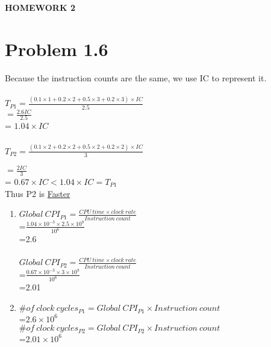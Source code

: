 \documentclass[]{article}
\begin{document}
\centerline{\bf \Large HOMEWORK 2} 

\bigskip
\section*{Problem 1.6}
Because the instruction counts are the same, we use IC to represent it.\\
\\
$T_{P1}= \frac{(0.1\times 1+0.2\times 2+0.5\times 3+0.2\times 3)\times IC}{2.5}$\
\\
\hspace*{4.5ex}$= \frac{2.6IC}{2.5}$\\
\hspace*{4.5ex}= $1.04\times IC$\\
\\
$T_{P2}= \frac{(0.1\times 2+0.2\times 2+0.5\times 2+0.2\times 2)\times IC}{3}$\

\hspace*{1ex}$= \frac{2IC}{3}$\\
\hspace*{4.5ex}=  $0.67\times IC < 1.04\times IC = T_{P1}$\\
Thus P2 is \underline{Faster}
\begin{enumerate}[(1)]
\item $Global\ CPI_{P1} = \frac{CPU\ time\times clock\ rate}{Instruction\ count}$\\
\hspace*{15.3ex}=$\frac{1.04\times 10^{-3}\times 2.5\times 10^9}{10^6}$\\
\hspace*{15.3ex}=2.6\\
\\$Global\ CPI_{P2} = \frac{CPU\ time\times clock\ rate}{Instruction\ count}$\\
\hspace*{15.3ex}=$\frac{0.67\times 10^{-3}\times 3\times 10^9}{10^6}$\\
\hspace*{15.3ex}=2.01
\item $\#of\ clock\ cycles_{P1} = Global\ CPI_{P1}\times Instruction\ count$\\
\hspace*{20.5ex}=$2.6\times 10^6$\\
$\#of\ clock\ cycles_{P2} = Global\ CPI_{P2}\times Instruction\ count$\\
\hspace*{20.5ex}=$2.01\times 10^6$\\
\end{enumerate}
\newpage
\end{document}
